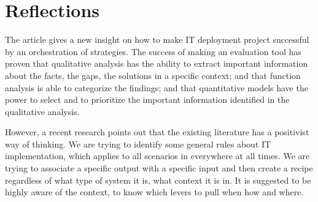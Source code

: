 
\section{Reflections}

The article gives a new insight on how to make IT deployment project successful by an orchestration of strategies. The success of making an evaluation tool has proven that qualitative analysis has the ability to extract important information about the facts, the gaps, the solutions in a specific context; and that function analysis is able to categorize the findings; and that quantitative models have the power to select and to prioritize the important information identified in the qualitative analysis.

However, a recent research points out that the existing literature has a positivist way of thinking. We are trying to identify some general rules about IT implementation, which applies to all scenarios in everywhere at all times. We are trying to associate a specific output with a specific input and then create a recipe regardless of what type of system it is, what context it is in. It is suggested to be highly aware of the context, to know which levers to pull when how and where\parencite{6}.
